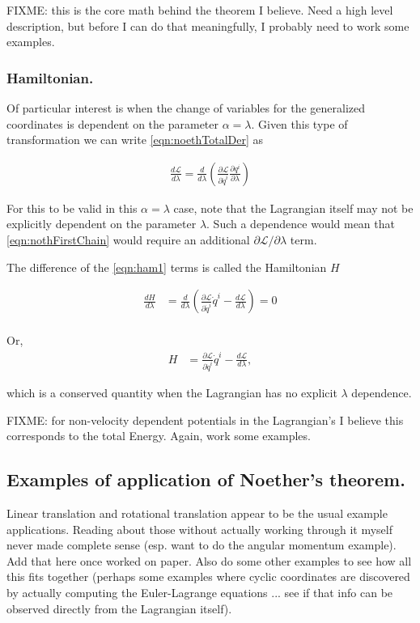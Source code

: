 \documentclass{article}
\newcommand{\LL}[0]{\mathcal{L}}
\newcommand{\qdot}[0]{\dot{q}}
\newcommand{\PD}[2]{\frac{\partial {#2}}{\partial {#1}}}
\newcommand{\PDi}[2]{{\partial {#2}}/{\partial {#1}}}
\begin{document}
FIXME: this is the core math behind the theorem I believe.  Need a high level description, but before I can do that meaningfully, I probably need to work
some examples.

\subsubsection{ Hamiltonian. }

Of particular interest is when the change of variables for the generalized coordinates is dependent on the parameter $\alpha = \lambda$.
Given this type of transformation we can write
\ref{eqn:noethTotalDer} as

\begin{align}\label{eqn:ham1}
\frac{d\LL}{d\lambda} = \frac{d}{d\lambda} \left( \PD{\qdot^i}{\LL} \PD{\lambda}{q^i} \right)
\end{align}

For this to be valid in this $\alpha = \lambda$ case, note that the Lagrangian
itself may not be explicitly dependent on the parameter $\lambda$.  Such a dependence would mean that \ref{eqn:nothFirstChain}
would require an additional $\PDi{\lambda}{\LL}$ term.

The difference of the \ref{eqn:ham1} terms is called the Hamiltonian $H$

\begin{align*}
\frac{dH}{d\lambda} &= \frac{d}{d\lambda} \left( \PD{\qdot^i}{\LL} \qdot^i - \frac{d\LL}{d\lambda} \right) = 0 \\
\end{align*}

Or,
\begin{align*}
H &= \PD{\qdot^i}{\LL} \qdot^i - \frac{d\LL}{d\lambda},
\end{align*}

which is a conserved quantity 
when the Lagrangian has no explicit $\lambda$ dependence.

FIXME: for non-velocity dependent potentials in the Lagrangian's I believe
this corresponds to the total Energy.  Again, work some examples.

\subsection{ Examples of application of Noether's theorem. }

Linear translation and rotational translation appear to be the usual example
applications.  Reading about those without actually working through it 
myself never made complete sense (esp. want to do the angular momentum
example).  Add that here once worked on paper.  Also do some other examples
to see how all this fits together (perhaps some examples where cyclic
coordinates are discovered by actually computing the Euler-Lagrange equations
... see if that info can be observed directly from the Lagrangian itself).
\end{document}
